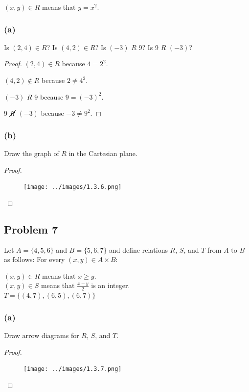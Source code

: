 \documentclass[14pt]{extarticle}
\begin{document}
\begin{center}
$(x, y) \in R$ means that $y = x^2$.
\end{center}

\subsubsection{(a)}
Is $(2, 4) \in R$? Is $(4, 2) \in R$? Is $(-3)$ $R$ 9? Is 9 $R$ $(-3)$?

\begin{proof}
$(2, 4) \in R$ because $4 = 2^2$.

$(4, 2) \notin R$ because $2 \neq 4^2$.

$(-3)$ $R$ 9 because $9 = (-3)^2$.

9 $\cancel{R}$ $(-3)$ because $-3 \neq 9^2$.
\end{proof}

\subsubsection{(b)}
Draw the graph of $R$ in the Cartesian plane.

\begin{proof}
\begin{figure}[ht!]
\centering
\texttt{[image: ../images/1.3.6.png]}
\end{figure}
\end{proof}

\subsection{Problem 7}
Let $A = \{4, 5, 6\}$ and $B = \{5, 6, 7\}$ and define relations $R$, $S$, and
$T$ from $A$ to $B$ as follows: For every $(x, y) \in A \times B$:

\begin{center}
$(x, y) \in R$ means that $x \geq y$. \\
$(x, y) \in S$ means that $\frac{x-y}{2}$ is an integer. \\
$T = \{(4, 7), (6, 5), (6, 7)\}$
\end{center}

\subsubsection{(a)}
Draw arrow diagrams for $R$, $S$, and $T$.

\begin{proof}
\begin{figure}[ht!]
\centering
\texttt{[image: ../images/1.3.7.png]}
\end{figure}
\end{proof}
\end{document}
